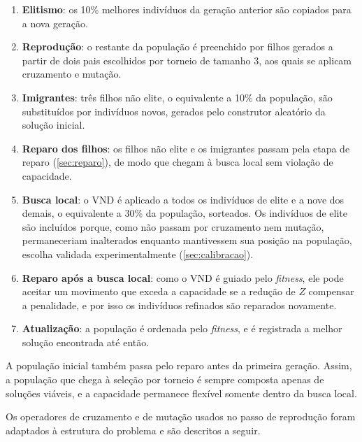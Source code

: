 \begin{enumerate}
    \item \textbf{Elitismo}: os 10\% melhores indivíduos da geração anterior são copiados para a nova geração.
    \item \textbf{Reprodução}: o restante da população é preenchido por filhos gerados a partir de dois pais escolhidos por torneio de tamanho 3, aos quais se aplicam cruzamento e mutação.
    \item \textbf{Imigrantes}: três filhos não elite, o equivalente a 10\% da população, são substituídos por indivíduos novos, gerados pelo construtor aleatório da solução inicial.
    \item \textbf{Reparo dos filhos}: os filhos não elite e os imigrantes passam pela etapa de reparo (\autoref{sec:reparo}), de modo que chegam à busca local sem violação de capacidade.
    \item \textbf{Busca local}: o VND é aplicado a todos os indivíduos de elite e a nove dos demais, o equivalente a 30\% da população, sorteados. Os indivíduos de elite são incluídos porque, como não passam por cruzamento nem mutação, permaneceriam inalterados enquanto mantivessem sua posição na população, escolha validada experimentalmente (\autoref{sec:calibracao}).
    \item \textbf{Reparo após a busca local}: como o VND é guiado pelo \textit{fitness}, ele pode aceitar um movimento que exceda a capacidade se a redução de $Z$ compensar a penalidade, e por isso os indivíduos refinados são reparados novamente.
    \item \textbf{Atualização}: a população é ordenada pelo \textit{fitness}, e é registrada a melhor solução encontrada até então.
\end{enumerate}

A população inicial também passa pelo reparo antes da primeira geração. Assim, a população que chega à seleção por torneio é sempre composta apenas de soluções viáveis, e a capacidade permanece flexível somente dentro da busca local.

Os operadores de cruzamento e de mutação usados no passo de reprodução foram adaptados à estrutura do problema e são descritos a seguir.

